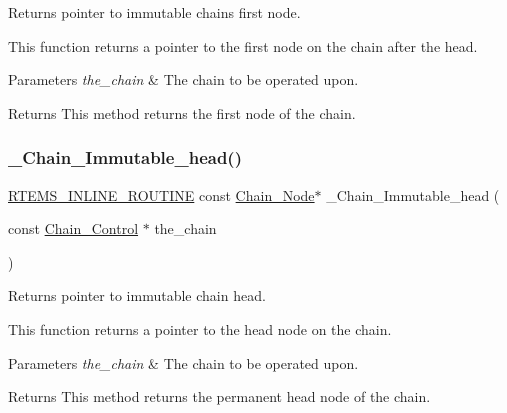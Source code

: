 Returns pointer to immutable chain\textquotesingle{}s first node. 

This function returns a pointer to the first node on the chain after the head.


\begin{DoxyParams}{Parameters}
{\em the\+\_\+chain} & The chain to be operated upon.\\
\hline
\end{DoxyParams}
\begin{DoxyReturn}{Returns}
This method returns the first node of the chain. 
\end{DoxyReturn}
\mbox{\label{group__RTEMSScoreChain_ga88bf8739d7ea05e614b67cb652191795}} 
\subsubsection{\texorpdfstring{\_Chain\_Immutable\_head()}{\_Chain\_Immutable\_head()}}
{\footnotesize\ttfamily \mbox{\hyperlink{group__RTEMSScoreBaseDefs_gac216239df231d5dbd15e3520b0b9313f}{R\+T\+E\+M\+S\+\_\+\+I\+N\+L\+I\+N\+E\+\_\+\+R\+O\+U\+T\+I\+NE}} const \mbox{\hyperlink{group__RTEMSScoreChain_ga0dd4bfcca1ac7f90de2842e447846d3d}{Chain\+\_\+\+Node}}$\ast$ \+\_\+\+Chain\+\_\+\+Immutable\+\_\+head (\begin{DoxyParamCaption}\item[{const \mbox{\hyperlink{unionChain__Control}{Chain\+\_\+\+Control}} $\ast$}]{the\+\_\+chain }\end{DoxyParamCaption})}



Returns pointer to immutable chain head. 

This function returns a pointer to the head node on the chain.


\begin{DoxyParams}{Parameters}
{\em the\+\_\+chain} & The chain to be operated upon.\\
\hline
\end{DoxyParams}
\begin{DoxyReturn}{Returns}
This method returns the permanent head node of the chain. 
\end{DoxyReturn}
\mbox{\label{group__RTEMSScoreChain_gae66d9e6f15f8bf60da087c079c0dfcad}} 

